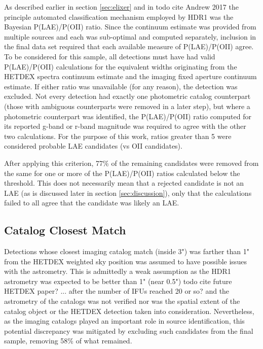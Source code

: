 \documentclass{aastex62}
\begin{document}
As described earlier in section \ref{sec:elixer} and in {\color{red} todo cite Andrew 2017} the principle automated classification mechanism employed by HDR1 was the Bayesian P(LAE)/P(OII) ratio. Since the continuum estimate was provided from multiple sources and each was sub-optimal and computed separately, inclusion in the final data set required that each available measure of P(LAE)/P(OII) agree. To be considered for this sample, all detections must have had valid P(LAE)/P(OII) calculations for the equivalent widths originating from the HETDEX spectra continuum estimate and the imaging fixed aperture continuum estimate. If either ratio was unavailable (for any reason), the detection was excluded. Not every detection had exactly one photometric catalog counterpart (those with ambiguous counterparts were removed in a later step), but where a photometric counterpart was identified, the P(LAE)/P(OII) ratio computed for its reported g-band or r-band magnitude was required to agree with the other two calculations. For the purpose of this work, ratios greater than 5 were considered probable LAE candidates (vs OII candidates).

After applying this criterion, 77\% of the remaining candidates were removed from the same for one or more of the P(LAE)/P(OII) ratios calculated below the threshold. This does not necessarily mean that a rejected candidate is not an LAE (as is discussed later in section \ref{sec:discussion}), only that the calculations failed to all agree that the candidate was likely an LAE.

\subsection{Catalog Closest Match}
Detections whose closest imaging catalog match (inside 3") was farther than 1" from the HETDEX weighted sky position was assumed to have possible issues with the astrometry. This is admittedly a weak assumption as the HDR1 astrometry was expected to be better than 1" (near 0.5") {\color{red} todo cite future HETDEX paper? ... after the number of IFUs reached 20 or so?} and the astrometry of the catalogs was not verified nor was the spatial extent of the catalog object or the HETDEX detection taken into consideration. Nevertheless, as the imaging catalogs played an important role in source identification, this potential discrepancy was mitigated by excluding such candidates from the final sample, removing 58\% of what remained.
\end{document}
